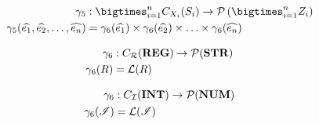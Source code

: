 \begin{align}
    \concrete_5 &: \bigtimes_{i = 1}^{n}C_{X_i}(S_i) \rightarrow \mathcal{P}\left(\bigtimes_{i = 1}^n Z_i \right) \\
    \concrete_5(\ab{e_1}, \ab{e_2}, \dots, \ab{e_n}) &= \concrete_6(\ab{e_1}) \times \concrete_6(\ab{e_2}) \times \dots \times \concrete_6(\ab{e_n})
\end{align}

\begin{align}
    \gamma_6 &: C_{\mathcal{R}}(\mathbf{REG}) \rightarrow \mathcal{P}(\mathbf{STR}) \\
    \gamma_6(R) &= \mathcal{L}(R)
\end{align}

\begin{align}
    \gamma_6 &: C_{\mathcal{\mathcal{I}}}(\mathbf{INT}) \rightarrow \mathcal{P}(\mathbf{NUM}) \\
    \gamma_6(\mathscr{I}) &= \mathcal{L}(\mathscr{I})
\end{align}
